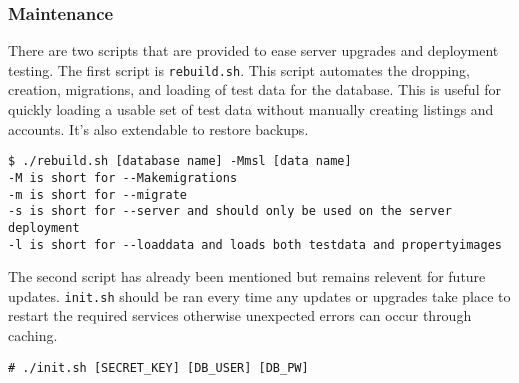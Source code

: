 \subsubsection{Maintenance}

There are two scripts that are provided to ease server upgrades and deployment
testing. The first script is \lstinline{rebuild.sh}. This script automates the
dropping, creation, migrations, and loading of test data for the database.
This is useful for quickly loading a usable set of test data without manually
creating listings and accounts. It's also extendable to restore backups.
\begin{lstlisting}
$ ./rebuild.sh [database name] -Mmsl [data name]
-M is short for --Makemigrations
-m is short for --migrate
-s is short for --server and should only be used on the server deployment
-l is short for --loaddata and loads both testdata and propertyimages
\end{lstlisting}

The second script has already been mentioned but remains relevent for future
updates. \lstinline{init.sh} should be ran every time any updates or upgrades
take place to restart the required services otherwise unexpected errors can
occur through caching.
\begin{lstlisting}
# ./init.sh [SECRET_KEY] [DB_USER] [DB_PW]
\end{lstlisting}
